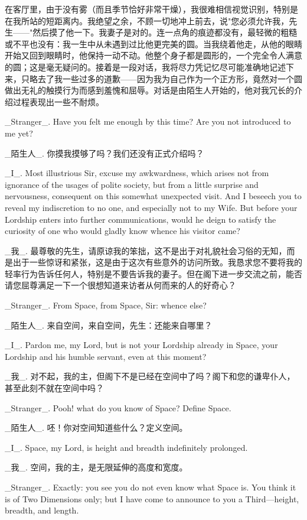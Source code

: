 \documentclass[12pt,UTF8]{ctexbook}
\begin{document}
在客厅里，由于没有雾（而且季节恰好非常干燥），我很难相信视觉识别，特别是在我所站的短距离内。我绝望之余，不顾一切地冲上前去，说"您必须允许我，先生——"然后摸了他一下。我妻子是对的。连一点角的痕迹都没有，最轻微的粗糙或不平也没有：我一生中从未遇到过比他更完美的圆。当我绕着他走，从他的眼睛开始又回到眼睛时，他保持一动不动。他整个身子都是圆形的，一个完全令人满意的圆；这是毫无疑问的。接着是一段对话，我将尽力凭记忆尽可能准确地记述下来，只略去了我一些过多的道歉——因为我为自己作为一个正方形，竟然对一个圆做出无礼的触摸行为而感到羞愧和屈辱。对话是由陌生人开始的，他对我冗长的介绍过程表现出一些不耐烦。

\_Stranger\_. Have you felt me enough by this time? Are you not introduced to me yet?

\_陌生人\_. 你摸我摸够了吗？我们还没有正式介绍吗？

\_I\_. Most illustrious Sir, excuse my awkwardness, which arises not from ignorance of the usages of polite society, but from a little surprise and nervousness, consequent on this somewhat unexpected visit. And I beseech you to reveal my indiscretion to no one, and especially not to my Wife. But before your Lordship enters into further communications, would he deign to satisfy the curiosity of one who would gladly know whence his visitor came?

\_我\_. 最尊敬的先生，请原谅我的笨拙，这不是出于对礼貌社会习俗的无知，而是出于一些惊讶和紧张，这是由于这次有些意外的访问所致。我恳求您不要将我的轻率行为告诉任何人，特别是不要告诉我的妻子。但在阁下进一步交流之前，能否请您屈尊满足一下一个很想知道来访者从何而来的人的好奇心？

\_Stranger\_. From Space, from Space, Sir: whence else?

\_陌生人\_. 来自空间，来自空间，先生：还能来自哪里？

\_I\_. Pardon me, my Lord, but is not your Lordship already in Space, your Lordship and his humble servant, even at this moment?

\_我\_. 对不起，我的主，但阁下不是已经在空间中了吗？阁下和您的谦卑仆人，甚至此刻不就在空间中吗？

\_Stranger\_. Pooh! what do you know of Space? Define Space.

\_陌生人\_. 呸！你对空间知道些什么？定义空间。

\_I\_. Space, my Lord, is height and breadth indefinitely prolonged.

\_我\_. 空间，我的主，是无限延伸的高度和宽度。

\_Stranger\_. Exactly: you see you do not even know what Space is. You think it is of Two Dimensions only; but I have come to announce to you a Third---height, breadth, and length.
\end{document}
